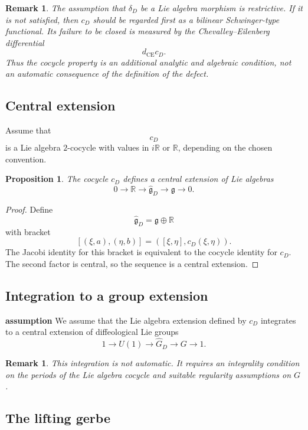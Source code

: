 \documentclass[11pt]{amsart}
\newtheorem{proposition}[definition]{Proposition}
\newtheorem{remark}[definition]{Remark}
\begin{document}
\begin{remark}
The assumption that \(\delta_D\) be a Lie algebra morphism is restrictive. If
it is not satisfied, then \(c_D\) should be regarded first as a bilinear
Schwinger-type functional. Its failure to be closed is measured by the
Chevalley--Eilenberg differential
\[
d_{\mathrm{CE}}c_D.
\]
Thus the cocycle property is an additional analytic and algebraic condition,
not an automatic consequence of the definition of the defect.
\end{remark}

\subsection{Central extension}

Assume that
\[
c_D
\]
is a Lie algebra \(2\)-cocycle with values in \(i\mathbb R\) or \(\mathbb R\),
depending on the chosen convention.

\begin{proposition}
The cocycle \(c_D\) defines a central extension of Lie algebras
\[
0
\longrightarrow
\mathbb R
\longrightarrow
\widehat{\mathfrak g}_D
\longrightarrow
\mathfrak g
\longrightarrow
0.
\]
\end{proposition}

\begin{proof}
Define
\[
\widehat{\mathfrak g}_D
=
\mathfrak g\oplus\mathbb R
\]
with bracket
\[
[(\xi,a),(\eta,b)]
=
([\xi,\eta],c_D(\xi,\eta)).
\]
The Jacobi identity for this bracket is equivalent to the cocycle identity for
\(c_D\). The second factor is central, so the sequence is a central extension.
\end{proof}

\subsection{Integration to a group extension}

\textbf{assumption}
We assume that the Lie algebra extension defined by \(c_D\) integrates to a
central extension of diffeological Lie groups
\[
1
\longrightarrow
U(1)
\longrightarrow
\widehat G_D
\longrightarrow
G
\longrightarrow
1.
\]


\begin{remark}
This integration is not automatic. It requires an integrality condition on the
periods of the Lie algebra cocycle and suitable regularity assumptions on
\(G\).
\end{remark}

\subsection{The lifting gerbe}
\end{document}
